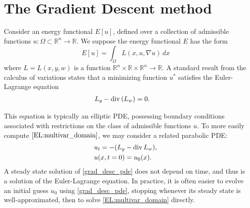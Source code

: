 \label{lab:tv_images}




\section*{The Gradient Descent method}
Consider an energy functional $E[u]$, defined over a collection of admissible functions $u:\Omega \subset \mathbb{R}^n \to \mathbb{R}$. 
We suppose the energy functional $E$ has the form 
\[E[u] = \int_{\Omega} L(x,u,\nabla u) \, dx\]
where $L = L(x,y,w)$ is a function $\mathbb{R}^n \times \mathbb{R} \times \mathbb{R}^n \to \mathbb{R}$. 
A standard result from the calculus of variations states that a minimizing function $u^*$ satisfies the Euler-Lagrange equation
\begin{align}
L_y - {\rm div}\,(L_w) &= 0.	\label{EL:multivar_domain}
\end{align}

This equation is typically an elliptic PDE, possessing boundary conditions associated with  restrictions on the class of admissible functions $u$.
To more easily compute $\eqref{EL:multivar_domain}$, we may consider a related parabolic PDE:
\begin{align}
	\begin{split}
	&{ } u_t = -(L_y - {\rm div}\, L_w),\\
	&{ } u(x,t=0) = u_0(x).
	\end{split} \label{grad_desc_pde}
\end{align}
A steady state solution of \eqref{grad_desc_pde} does not depend on time, and thus is a solution of the Euler-Lagrange equation. 
In practice, it is often easier to evolve an initial guess $u_0$ using \eqref{grad_desc_pde}, stopping whenever its steady state is well-approximated, then to solve \eqref{EL:multivar_domain} directly. 


